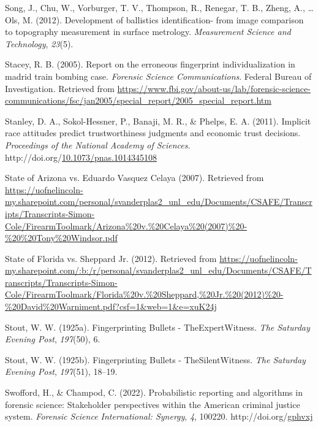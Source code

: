 \documentclass[print]{nuthesis}
\newlength{\cslhangindent}
\newenvironment{CSLReferences}[2]%
{\setlength{\parindent}{0pt}%
\everypar{\setlength{\hangindent}{\cslhangindent}}\ignorespaces}%
{\par}
\begin{document}
\begin{CSLReferences}{1}{0}
\leavevmode{}%
Song, J., Chu, W., Vorburger, T. V., Thompson, R., Renegar, T. B., Zheng, A., \ldots{} Ols, M. (2012). Development of ballistics identification- from image comparison to topography measurement in surface metrology. \emph{Measurement Science and Technology}, \emph{23}(5).

\leavevmode{}%
Stacey, R. B. (2005). Report on the erroneous fingerprint individualization in madrid train bombing case. \emph{Forensic Science Communications}. {Federal Bureau of Investigation}. Retrieved from \url{https://www.fbi.gov/about-us/lab/forensic-science-communications/fsc/jan2005/special_report/2005_special_report.htm}

\leavevmode{}%
Stanley, D. A., Sokol-Hessner, P., Banaji, M. R., \& Phelps, E. A. (2011). Implicit race attitudes predict trustworthiness judgments and economic trust decisions. \emph{Proceedings of the National Academy of Sciences}. http://doi.org/\href{https://doi.org/10.1073/pnas.1014345108}{10.1073/pnas.1014345108}

\leavevmode{}%
State of {Arizona} vs. Eduardo {Vasquez} {Celaya} (2007). Retrieved from \url{https://uofnelincoln-my.sharepoint.com/personal/svanderplas2_unl_edu/Documents/CSAFE/Transcripts/Transcripts-Simon-Cole/FirearmToolmark/Arizona\%20v.\%20Celaya\%20(2007)\%20-\%20\%20Tony\%20Windsor.pdf}

\leavevmode{}%
State of {Florida} vs. Sheppard {Jr.} (2012). Retrieved from \url{https://uofnelincoln-my.sharepoint.com/:b:/r/personal/svanderplas2_unl_edu/Documents/CSAFE/Transcripts/Transcripts-Simon-Cole/FirearmToolmark/Florida\%20v.\%20Sheppard,\%20Jr.\%20(2012)\%20-\%20David\%20Warniment.pdf?csf=1\&web=1\&e=xuK24j}

\leavevmode{}%
Stout, W. W. (1925a). {Fingerprinting} {Bullets} - {The}{Expert}{Witness}. \emph{The {Saturday} {Evening} {Post}}, \emph{197}(50), 6.

\leavevmode{}%
Stout, W. W. (1925b). {Fingerprinting} {Bullets} - {The}{Silent}{Witness}. \emph{The {Saturday} {Evening} {Post}}, \emph{197}(51), 18--19.

\leavevmode{}%
Swofford, H., \& Champod, C. (2022). Probabilistic reporting and algorithms in forensic science: {Stakeholder} perspectives within the {American} criminal justice system. \emph{Forensic Science International: Synergy}, \emph{4}, 100220. http://doi.org/\href{https://doi.org/gphvxj}{gphvxj}


\end{CSLReferences}
\end{document}
